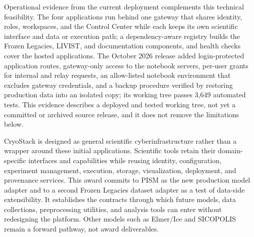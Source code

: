 Operational evidence from the current deployment complements this technical
feasibility. The four applications run behind one gateway that shares
identity, roles, workspaces, and the Control Center while each keeps its own
scientific interface and data or execution path; a dependency-aware registry
builds the Frozen Legacies, LIVIST, and documentation components, and health
checks cover the hosted applications. The October 2026 release added
login-protected application routes, gateway-only access to the notebook
servers, per-user grants for internal and relay requests, an allow-listed
notebook environment that excludes gateway credentials, and a backup procedure
verified by restoring production data into an isolated copy; its working tree
passes 3,649 automated tests. This evidence describes a deployed and tested
working tree, not yet a committed or archived source release, and it does not
remove the limitations below.

CryoStack is designed as general scientific cyberinfrastructure rather than a
wrapper around these initial applications. Scientific tools retain their
domain-specific interfaces and capabilities while reusing identity,
configuration, experiment management, execution, storage, visualization,
deployment, and provenance services. This award commits to PISM as the new
production model adapter and to a second Frozen Legacies dataset adapter as a
test of data-side extensibility. It establishes the contracts through which
future models, data collections, preprocessing utilities, and analysis tools
can enter without redesigning the platform. Other models such as Elmer/Ice and
SICOPOLIS remain a forward pathway, not award deliverables.

